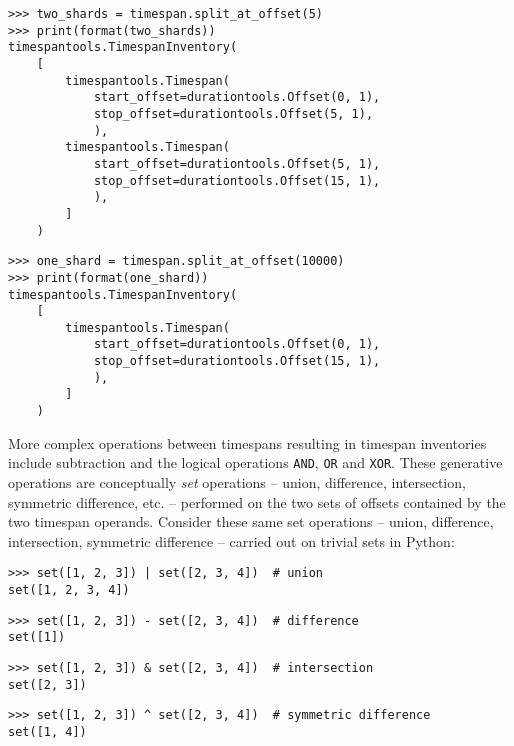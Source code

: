 \begin{singlespacing}
\vspace{-0.5\baselineskip}
\begin{lstlisting}
>>> two_shards = timespan.split_at_offset(5)
>>> print(format(two_shards))
timespantools.TimespanInventory(
    [
        timespantools.Timespan(
            start_offset=durationtools.Offset(0, 1),
            stop_offset=durationtools.Offset(5, 1),
            ),
        timespantools.Timespan(
            start_offset=durationtools.Offset(5, 1),
            stop_offset=durationtools.Offset(15, 1),
            ),
        ]
    )
\end{lstlisting}
\begin{lstlisting}
>>> one_shard = timespan.split_at_offset(10000)
>>> print(format(one_shard))
timespantools.TimespanInventory(
    [
        timespantools.Timespan(
            start_offset=durationtools.Offset(0, 1),
            stop_offset=durationtools.Offset(15, 1),
            ),
        ]
    )
\end{lstlisting}
\end{singlespacing}

\noindent More complex operations between timespans resulting in timespan
inventories include subtraction and the logical operations
\texttt{AND}, \texttt{OR} and \texttt{XOR}. These generative operations are
conceptually \emph{set} operations -- union, difference, intersection,
symmetric difference, etc. -- performed on the two sets of offsets contained by
the two timespan operands. Consider these same set operations -- union,
difference, intersection, symmetric difference -- carried out on trivial sets
in Python:

\begin{comment}
<abjad>
set([1, 2, 3]) | set([2, 3, 4])  # union
set([1, 2, 3]) - set([2, 3, 4])  # difference
set([1, 2, 3]) & set([2, 3, 4])  # intersection
set([1, 2, 3]) ^ set([2, 3, 4])  # symmetric difference
</abjad>
\end{comment}

\begin{singlespacing}
\vspace{-0.5\baselineskip}
\begin{lstlisting}
>>> set([1, 2, 3]) | set([2, 3, 4])  # union
set([1, 2, 3, 4])
\end{lstlisting}
\begin{lstlisting}
>>> set([1, 2, 3]) - set([2, 3, 4])  # difference
set([1])
\end{lstlisting}
\begin{lstlisting}
>>> set([1, 2, 3]) & set([2, 3, 4])  # intersection
set([2, 3])
\end{lstlisting}
\begin{lstlisting}
>>> set([1, 2, 3]) ^ set([2, 3, 4])  # symmetric difference
set([1, 4])
\end{lstlisting}
\end{singlespacing}

